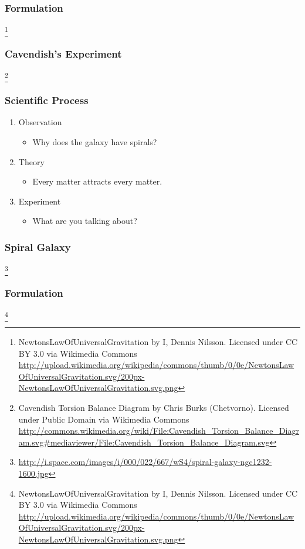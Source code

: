 \documentclass{beamer}
\begin{document}
\begin{CJK}{UTF8}{bsmi}
  \begin{frame}
    \frametitle{Formulation}
    \centerline{}\footnote{NewtonsLawOfUniversalGravitation by I, Dennis Nilsson. Licensed under CC BY 3.0 via Wikimedia Commons \url{http://upload.wikimedia.org/wikipedia/commons/thumb/0/0e/NewtonsLawOfUniversalGravitation.svg/200px-NewtonsLawOfUniversalGravitation.svg.png}}
  \end{frame}

  \begin{frame}
    \frametitle{Cavendish's Experiment}
    \centerline{}\footnote{Cavendish Torsion Balance Diagram by Chris Burks (Chetvorno). Licensed under Public Domain via Wikimedia Commons \url{http://commons.wikimedia.org/wiki/File:Cavendish_Torsion_Balance_Diagram.svg\#mediaviewer/File:Cavendish_Torsion_Balance_Diagram.svg}}
  \end{frame}


  \begin{frame}
    \frametitle{Scientific Process} 
    \begin{enumerate}
    \item Observation
      \begin{itemize}
      \item Why does the galaxy have spirals?
      \end{itemize}
    \item Theory
      \begin{itemize}
      \item Every matter attracts every matter.
      \end{itemize}
    \item Experiment
      \begin{itemize}
      \item What are you talking about?
      \end{itemize}
    \end{enumerate}
  \end{frame}


  \begin{frame}
    \frametitle{Spiral Galaxy}
    \centerline{}\footnote{\url{http://i.space.com/images/i/000/022/667/wS4/spiral-galaxy-ngc1232-1600.jpg}}
  \end{frame}


  \begin{frame}
    \frametitle{Formulation}
    \centerline{}\footnote{NewtonsLawOfUniversalGravitation by I, Dennis Nilsson. Licensed under CC BY 3.0 via Wikimedia Commons \url{http://upload.wikimedia.org/wikipedia/commons/thumb/0/0e/NewtonsLawOfUniversalGravitation.svg/200px-NewtonsLawOfUniversalGravitation.svg.png}}
  \end{frame}


\end{CJK}
\end{document}
